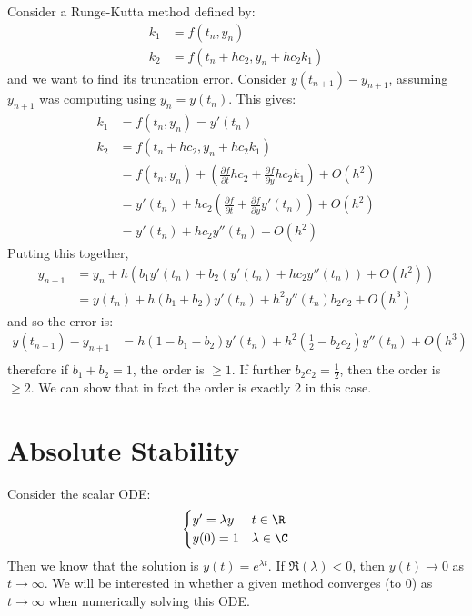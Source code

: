 \documentclass[../Main.tex]{subfiles}
\begin{document}
\begin{example}
    Consider a Runge-Kutta method defined by:
    \begin{align*}
        k_1 &= f(t_n, y_n) \\
        k_2 &= f(t_n + h c_2, y_n + h c_2 k_1)
    \end{align*}
    and we want to find its truncation error. Consider $y(t_{n+1}) - y_{n+1}$, assuming $y_{n+1}$ was computing using $y_n = y(t_n)$. This gives:
    \begin{align*}
        k_1 &= f(t_n, y_n) = y'(t_n) \\
        k_2 &= f(t_n + h c_2, y_n + h c_2 k_1) \\
        &= f(t_n, y_n) + \left(\frac{\partial f}{\partial t} h c_2 + \frac{\partial f}{\partial y} h c_2 k_1\right) + O(h^2) \\
        &= y'(t_n) + h c_2 \left(\frac{\partial f}{\partial t} + \frac{\partial f}{\partial y}y'(t_n)\right) + O(h^2) \\
        &= y'(t_n) + h c_2 y''(t_n) + O(h^2)
    \end{align*}
    Putting this together,
    \begin{align*}
        y_{n+1} &= y_n + h \left(b_1 y'(t_n) + b_2 \left(y'(t_n) + h c_2 y''(t_n)\right) + O(h^2)\right) \\
        &= y(t_n) + h \left(b_1 + b_2\right) y'(t_n) + h^2 y''(t_n) b_2 c_2 + O(h^3)
    \end{align*}
    and so the error is:
    \begin{align*}
        y(t_{n+1}) - y_{n+1} &= h\left(1 - b_1 - b_2\right)y'(t_n) + h^2 \left(\frac12 - b_2 c_2\right)y''(t_n) + O(h^3) \\
    \end{align*}
    therefore if $b_1 + b_2 = 1$, the order is $\geq 1$. If further $b_2 c_2 = \frac12$, then the order is $\geq 2$. We can show that in fact the order is exactly 2 in this case.
\end{example}
\section{Absolute Stability}
Consider the scalar ODE:
\begin{equation}
    \begin{cases}
        y' = \lambda y & t \in \R \\
        y(0) = 1 & \lambda \in \C
    \end{cases}
    \label{eqnStabilityODE}
\end{equation}
Then we know that the solution is $y(t) = e^{\lambda t}$. If $\Re(\lambda) < 0$, then $y(t) \to 0$ as $t \to \infty$. We will be interested in whether a given method converges (to 0) as $t \to \infty$ when numerically solving this ODE.
\end{document}

